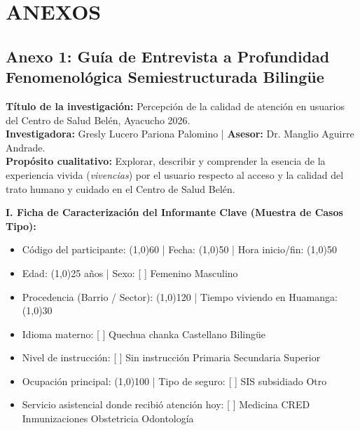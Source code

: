 \appendix
\section*{ANEXOS}
\label{sec:anexos}

\subsection*{Anexo 1: Guía de Entrevista a Profundidad Fenomenológica Semiestructurada Bilingüe}
\label{anx:1_guia}

\noindent\textbf{Título de la investigación:} Percepción de la calidad de atención en usuarios del Centro de Salud Belén, Ayacucho 2026.\\
\textbf{Investigadora:} Gresly Lucero Pariona Palomino \quad | \quad \textbf{Asesor:} Dr. Manglio Aguirre Andrade.\\
\textbf{Propósito cualitativo:} Explorar, describir y comprender la esencia de la experiencia vivida (\textit{vivencias}) por el usuario respecto al acceso y la calidad del trato humano y cuidado en el Centro de Salud Belén.

\vspace{0.3cm}
\noindent\textbf{I. Ficha de Caracterización del Informante Clave (Muestra de Casos Tipo):}
\begin{itemize}
    \item Código del participante: \line(1,0){60} \quad | \quad Fecha: \line(1,0){50} \quad | \quad Hora inicio/fin: \line(1,0){50}
    \item Edad: \line(1,0){25} años \quad | \quad Sexo: [ \phantom{X} ] Femenino \quad [ \phantom{X} ] Masculino
    \item Procedencia (Barrio / Sector): \line(1,0){120} \quad | \quad Tiempo viviendo en Huamanga: \line(1,0){30}
    \item Idioma materno: [ \phantom{X} ] Quechua chanka \quad [ \phantom{X} ] Castellano \quad [ \phantom{X} ] Bilingüe
    \item Nivel de instrucción: [ \phantom{X} ] Sin instrucción \quad [ \phantom{X} ] Primaria \quad [ \phantom{X} ] Secundaria \quad [ \phantom{X} ] Superior
    \item Ocupación principal: \line(1,0){100} \quad | \quad Tipo de seguro: [ \phantom{X} ] SIS subsidiado \quad [ \phantom{X} ] Otro
    \item Servicio asistencial donde recibió atención hoy: [ \phantom{X} ] Medicina \quad [ \phantom{X} ] CRED \quad [ \phantom{X} ] Inmunizaciones \quad [ \phantom{X} ] Obstetricia \quad [ \phantom{X} ] Odontología
\end{itemize}

